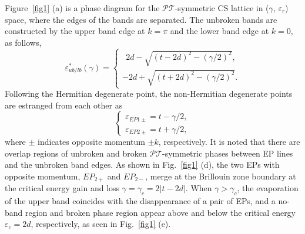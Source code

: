 \documentclass[report,epsfig,pre]{revtex4}
\begin{document}
Figure~\ref{fig1} (a) is a phase diagram for the $\mathcal{PT}$-symmetric CS lattice in ($\gamma$, $\varepsilon_r$) space, where the edges of the bands are separated.
The unbroken bands are constructed by the upper band edge at $k=\pi$ and the lower band edge at $k=0$, as follows,
\begin{equation}
\varepsilon_{ub/lb}^*(\gamma)=
   \begin{cases}
        ~~2d-\sqrt{(t-2d)^2-(\gamma/2)^2},\\
        -2d+\sqrt{(t+2d)^2-(\gamma/2)^2}.
   \end{cases}
\end{equation}
Following the Hermitian degenerate point, the non-Hermitian degenerate points are estranged from each other as
\begin{equation}
\begin{cases} \varepsilon_{EP1\pm}=t-\gamma/2,\\
\varepsilon_{EP2\pm}=t+\gamma/2,
\end{cases}
\end{equation}
where $\pm$ indicates opposite momentum $\pm k$, respectively. 
It is noted that there are overlap regions of unbroken and broken $\mathcal{PT}$-symmetric phases between EP lines and the unbroken band edges. As shown in Fig.~\ref{fig1} (d), the two EPs with opposite momentum, $EP_{2+}$ and $EP_{2-}$, merge at the Brillouin zone boundary at the critical energy gain and loss $\gamma = \gamma_{c}=2 \left|t-2d \right|$. When $\gamma >\gamma_{c}$, the evaporation of the upper band coincides with the disappearance of a pair of EPs, and a no-band region and broken phase region appear above and below the critical energy $\varepsilon_{c}=2d$, respectively, as seen in Fig.~\ref{fig1} (e).


\end{document}
